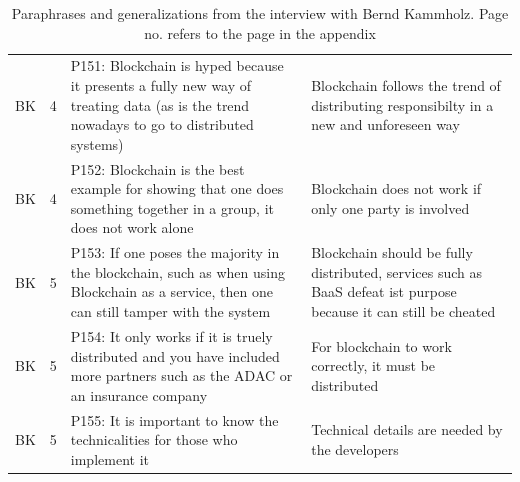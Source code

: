 \begin{table}[H]
\begin{tabularx}{\textwidth}{ll|X|p{4.5cm}}
	BK & 4 & P151: Blockchain is hyped because it presents a fully new way of treating data (as is the trend nowadays to go to distributed systems) & Blockchain follows the trend of distributing responsibilty in a new and unforeseen way \\  
	BK & 4 & P152: Blockchain is the best example for showing that one does something together in a group, it does not work alone & Blockchain does not work if only one party is involved \\  
	BK & 5 & P153: If one poses the majority in the blockchain, such as when using Blockchain as a service, then one can still tamper with the system & Blockchain should be fully distributed, services such as BaaS defeat ist purpose because it can still be cheated \\  
	BK & 5 & P154: It only works if it is truely distributed and you have included more partners such as the ADAC or an insurance company & For blockchain to work correctly, it must be distributed \\ 
	BK & 5 & P155: It is important to know the technicalities for those who implement it & Technical details are needed by the developers \\
\end{tabularx}
\caption{Paraphrases and generalizations from the interview with Bernd Kammholz. Page no. refers to the page in the appendix}
\end{table}


